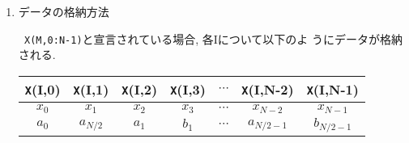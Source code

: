 \documentclass[a4j]{jsarticle}
\begin{document}
\begin{enumerate}
  \item データの格納方法

  \texttt{ X(M,0:N-1)}と宣言されている場合, 各Iについて以下のよ
   うにデータが格納される.

    \begin{tabular}{|c|c|c|c|c|c|c|}\hline
     \texttt X(I,0) & \texttt X(I,1) & \texttt X(I,2) & \texttt X(I,3) & 
     $\cdots$ & \texttt X(I,N-2) & \texttt X(I,N-1) \\\hline\hline
      $x_0$ & $x_1$ & $x_2$ & $x_3$ &
     $\cdots$ & $x_{N-2}$ & $x_{N-1}$ \\\hline
      $a_0$ & $a_{N/2}$ & $a_1$ & $b_1$ &
     $\cdots$ & $a_{N/2-1}$ & $b_{N/2-1}$ \\\hline
    \end{tabular}

\end{enumerate}
\end{document}
